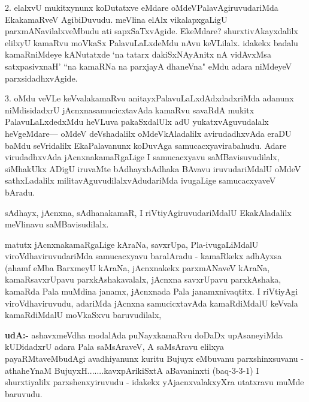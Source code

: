 \begin{artha}
2. elalxvU mukitxynunx koDutatxve eMdare oMdeVPalavAgiruvudariMda EkakamaRveV AgibiDuvudu. meVlina elAlx vikalapxgaLigU parxmANavilalxveMbudu ati sapxSaTxvAgide. EkeMdare? shurxtivAkayxdalilx elilxyU kamaRvu moVkaSx PalavuLaLxdeMdu nAvu keVLilalx. idakekx badalu kamaRniMdeye kANutatxde `na tatarx dakiSxNAyAnitx nA vidAvxMsa satxpasivxnaH' ``na kamaRNa na parxjayA dhaneVna" eMdu adara niMdeyeV parxsidadhxvAgide.
\end{artha}

\begin{artha}
3. oMdu veVLe keVvalakamaRvu anitayxPalavuLaLxdAdxdadxriMda adanunx niMdisidadx\-rU jAcnxnasamucicxtavAda kamaRvu savaRdA mukitx PalavuLaLxdedxMdu heVLuva pakaSx\-dalUlx adU yukatxvAguvudalalx heVgeMdare--- oMdeV deVshadalilx oMdeVkAladalilx avirudadhx\-vAda eraDU baMdu seVridalilx EkaPalavanunx koDuvAga samucacxyavira\-bahudu. Adare virudadhxvAda jAcnxnakamaRgaLige I samucacxyavu saMBavisuvudilalx, siMhakUkx ADigU iruvaMte bAdhayxbAdhaka BAvavu iruvudariMdalU oMdeV sathxLadalilx milita\-vAguvudilalxvAdudariMda ivugaLige samucacxyaveV bAradu.
\end{artha}

\begin{artha}
sAdhayx, jAcnxna, sAdhanakamaR, I riVtiyAgiruvudariMdalU EkakAladalilx meVlinavu 
saMBavisudilalx.
\end{artha}


\begin{artha}
matutx jAcnxnakamaRgaLige kAraNa, savxrUpa, Pla-ivugaLiMdalU viroVdha\-viruvudariMda samucacxyavu baralAradu - kamaRkekx adhAyxsa (ahamf eMba BarxmeyU kAraNa, jAcnxnakekx parxmANaveV kAraNa, kamaRsavxrUpavu parxkAshakavalalx, \-jAcnxna savxrUpavu parxkAshaka, kamaRda Pala muMdina janamx, jAcnxnada Pala janamxnivaqtitx. I riVtiyAgi viroVdhaviruvudu, adariMda jAcnxna samucicxtavAda kamaRdiMdalU keVvala kamaRdiMdalU moVkaSxvu baruvudilalx, 
\end{artha}


\begin{artha}
{\bf udA:-} ashavxmeVdha modalAda puNayxkamaRvu doDaDx upAsaneyiMda kUDi\-dadxrU adara Pala saMsAraveV, A saMsAravu elilxya payaRMtaveMbudAgi avadhi\-yanunx kuritu Bujuyx eMbuvanu parxshinxsuvanu - athaheYnaM BujuyxH.......kavxpArikiSxtA aBavaninxti (baq-3-3-1) I shurxtiyalilx parxshenxyiruvudu - idakekx yAjacnxvalakxyXra utatxravu muMde baruvudu.
\end{artha}

